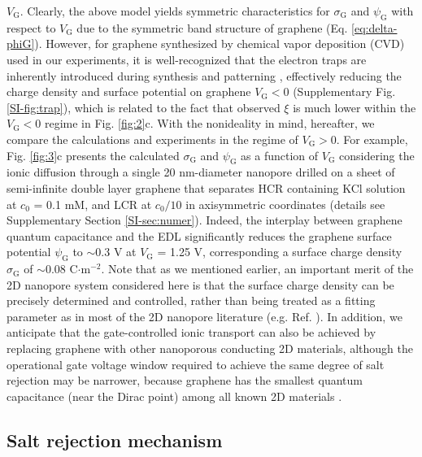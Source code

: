 \documentclass[journal=nalefd,email=true, hyperref=true, keywords=false]{achemso}
\newcommand{\Fig}{Fig.}
\begin{document}
$V_{\mathrm{G}}$. Clearly, the above model yields symmetric
characteristics for $\sigma_{\mathrm{G}}$ and $\psi_{\mathrm{G}}$ with
respect to $V_{\mathrm{G}}$ due to the symmetric band structure of
graphene (Eq. \eqref{eq:delta-phiG}). However, for graphene
synthesized by chemical vapor deposition (CVD) used in our
experiments, it is well-recognized that the electron traps are
inherently introduced during synthesis and patterning
\cite{Dean_2010}, effectively reducing the charge density and surface
potential on graphene $V_{\mathrm{G}}<0$ (Supplementary \Fig{}
\ref{SI-fig:trap}), which is related to the fact that observed $\xi$
is much lower within the $V_{\mathrm{G}}<0$ regime in \Fig{}
\ref{fig:2}c. With the nonideality in mind, hereafter, we compare the
calculations and experiments in the regime of $V_{\mathrm{G}}>0$. For
example, \Fig{} \ref{fig:3}c presents the calculated
$\sigma_{\mathrm{G}}$ and $\psi_{\mathrm{G}}$ as a function of
$V_{\mathrm{G}}$ considering the ionic diffusion through a single 20
nm-diameter nanopore drilled on a sheet of semi-infinite double layer
graphene that separates HCR containing KCl solution at $c_{0}$ = 0.1
mM, and LCR at $c_{0}/10$ in axisymmetric coordinates (details see
Supplementary Section \ref{SI-sec:numer}). Indeed, the interplay
between graphene quantum capacitance and the EDL significantly reduces
the graphene surface potential $\psi_{\mathrm{G}}$ to $\sim$0.3 V at
$V_{\mathrm{G}}$ = 1.25 V, corresponding a surface charge density
$\sigma_{\mathrm{G}}$ of $\sim$0.08 C$\cdot$m$^{-2}$. Note that as we
mentioned earlier, an important merit of the 2D nanopore system
considered here is that the surface charge density can be precisely
determined and controlled, rather than being treated as a fitting
parameter as in most of the 2D nanopore literature
(e.g. Ref. ). In addition, we anticipate that
the gate-controlled ionic transport can also be achieved by replacing
graphene with other nanoporous conducting 2D materials, although the
operational gate voltage window required to achieve the same degree of
salt rejection may be narrower, because graphene has the smallest
quantum capacitance (near the Dirac point) among all known 2D
materials \cite{Tian_2016}.

\subsection{Salt rejection mechanism}
\label{sec:mechanism}
\end{document}
